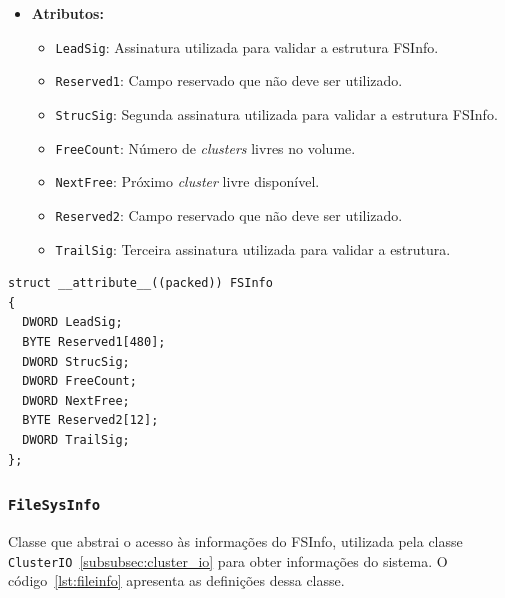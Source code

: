 \documentclass[
    12pt,				%
    oneside,   	        %
    a4paper,			%
    english,			%
    french,				%
    spanish,			%
    brazil,				%
    ]{pacotes/abntex2}
\begin{document}
\begin{itemize}
    \item \textbf{Atributos:}
        \begin{itemize}
            \item \texttt{LeadSig}: Assinatura utilizada para validar a estrutura FSInfo.
            \item \texttt{Reserved1}: Campo reservado que não deve ser utilizado.
            \item \texttt{StrucSig}: Segunda assinatura utilizada para validar a estrutura FSInfo.
            \item \texttt{FreeCount}: Número de \textit{clusters} livres no volume.
            \item \texttt{NextFree}: Próximo \textit{cluster} livre disponível.
            \item \texttt{Reserved2}: Campo reservado que não deve ser utilizado.
            \item \texttt{TrailSig}: Terceira assinatura utilizada para validar a estrutura.
        \end{itemize}
\end{itemize}


\begin{lstlisting}[caption={Estrutura que representa o FSInfo encontrado no volume FAT}, label={lst:fsinfo}]
struct __attribute__((packed)) FSInfo
{
  DWORD LeadSig;
  BYTE Reserved1[480]; 
  DWORD StrucSig; 
  DWORD FreeCount; 
  DWORD NextFree; 
  BYTE Reserved2[12]; 
  DWORD TrailSig; 
};
\end{lstlisting}

\subsubsection{\texttt{FileSysInfo}}
\label{subsubsec:file_sys_info}

Classe que abstrai o acesso às informações do FSInfo, utilizada pela classe \texttt{ClusterIO}~\ref{subsubsec:cluster_io} para obter informações do sistema. O código~\ref{lst:fileinfo} apresenta as definições dessa classe. 
\end{document}

